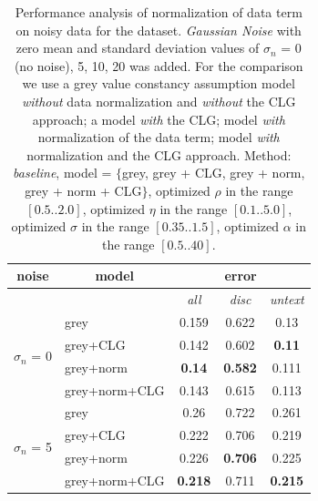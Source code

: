 \begin{table}[ht] \scriptsize
  \centering
  \caption{Performance analysis of normalization of data term on noisy data for the \rub dataset. \textit{Gaussian Noise} with zero mean and standard deviation values of $\sigma_n$ = 0 (no noise), 5, 10, 20 was added. For the comparison we use a grey value constancy assumption model \textit{without} data normalization and \textit{without} the CLG approach; a model \textit{with} the CLG; model \textit{with} normalization of the data term; model \textit{with} normalization and the CLG approach.  Method: \textit{baseline}, model = $\lbrace$grey, grey + CLG, grey + norm, grey + norm + CLG$\rbrace$,  optimized $\rho$ in the range $[0.5 .. 2.0]$, optimized  $\eta$ in the range $[0.1 .. 5.0]$, optimized  $\sigma$ in the range $[0.35 .. 1.5]$, optimized  $\alpha$ in the range $[0.5 .. 40]$.}
    \begin{tabular}{crcrr}
    \toprule
    \multicolumn{1}{c}{noise} & \multicolumn{1}{c}{model} & \multicolumn{3}{c}{error} \\
    \midrule
    \multicolumn{1}{c}{} & \multicolumn{1}{c}{} & \textit{all} & \multicolumn{1}{c}{\textit{disc}} & \multicolumn{1}{c}{\textit{untext}} \\
    \midrule
    \midrule
    \multicolumn{1}{r}{\multirow{4}[0]{*}{$\sigma_n$ = 0}} & \multicolumn{1}{l}{grey} & 0.159 & \multicolumn{1}{c}{0.622} & \multicolumn{1}{c}{0.13} \\
          & \multicolumn{1}{l}{grey+CLG} & 0.142 & \multicolumn{1}{c}{0.602} & \multicolumn{1}{c}{\textbf{0.11}} \\
          & \multicolumn{1}{l}{grey+norm} & \textbf{0.14} & \multicolumn{1}{c}{\textbf{0.582}} & \multicolumn{1}{c}{0.111} \\
          & \multicolumn{1}{l}{grey+norm+CLG} & 0.143 & \multicolumn{1}{c}{0.615} & \multicolumn{1}{c}{0.113} \\
          
          \midrule
          
    \multicolumn{1}{r}{\multirow{4}[0]{*}{$\sigma_n$ = 5}} & \multicolumn{1}{l}{grey} & 0.26  & \multicolumn{1}{c}{0.722} & \multicolumn{1}{c}{0.261} \\
          & \multicolumn{1}{l}{grey+CLG} & 0.222 & \multicolumn{1}{c}{0.706} & \multicolumn{1}{c}{0.219} \\
          & \multicolumn{1}{l}{grey+norm} & 0.226 & \multicolumn{1}{c}{\textbf{0.706}} & \multicolumn{1}{c}{0.225} \\
          & \multicolumn{1}{l}{grey+norm+CLG} & \textbf{0.218} & \multicolumn{1}{c}{0.711} & \multicolumn{1}{c}{\textbf{0.215}} \\
          

\end{tabular}
\end{table}
